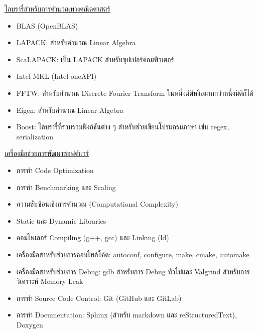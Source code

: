 \noindent \underline{ไลบรารี่สำหรับการคำนวณทางคณิตศาสตร์}
%
\begin{itemize}[topsep=0pt,noitemsep]
  \item BLAS (OpenBLAS)

  \item LAPACK: สำหรับคำนวณ Linear Algebra

  \item ScaLAPACK: เป็น LAPACK สำหรับซุปเปอร์คอมพิวเตอร์

  \item Intel MKL (Intel oneAPI)

  \item FFTW: สำหรับคำนวณ Discrete Fourier Transform ในหนึ่งมิติหรือมากกว่าหนึ่งมิติก็ได้

  \item Eigen: สำหรับคำนวณ Linear Algebra

  \item Boost: ไลบรารี่ที่รวบรวมฟังก์ชันต่าง ๆ สำหรับช่วยเขียนโปรแกรมภาษา \cpp เช่น regex, serialization
\end{itemize}

\noindent \underline{เครื่องมือช่วยการพัฒนาซอฟต์แวร์}
%
\begin{itemize}[topsep=0pt,noitemsep]
  \item การทำ Code Optimization

  \item การทำ Benchmarking และ Scaling

  \item ความซับซ้อนเชิงการคำนวณ (Computational Complexity)

  \item Static และ Dynamic Libraries

  \item คอมไพเลอร์ Compiling (g++, gcc) และ Linking (ld)

  \item เครื่องมือสำหรับช่วยการคอมไพล์โค้ด: autoconf, configure, make, cmake, automake

  \item เครื่องมือสำหรับช่วยการ Debug: gdb สำหรับการ Debug ทั่วไปและ Valgrind สำหรับการวิเคราะห์ Memory Leak

  \item การทำ Source Code Control: Git (GitHub และ GitLab)

  \item การทำ Documentation: Sphinx (สำหรับ markdown และ reStructuredText), Doxygen
\end{itemize}

